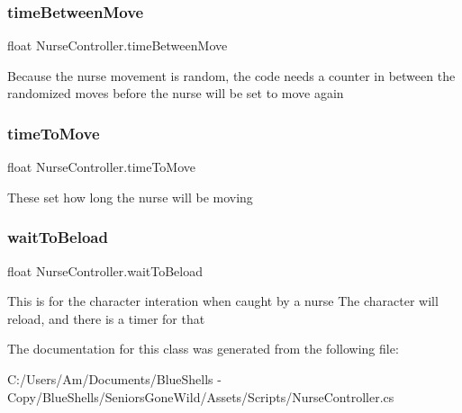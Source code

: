\subsubsection{\texorpdfstring{time\+Between\+Move}{timeBetweenMove}}
{\footnotesize\ttfamily float Nurse\+Controller.\+time\+Between\+Move}



Because the nurse movement is random, the code needs a counter in between the randomized moves before the nurse will be set to move again 

\mbox{\label{class_nurse_controller_a8d3c0f3a1e8e1b2082e98926c1e6ede6}} 
\subsubsection{\texorpdfstring{time\+To\+Move}{timeToMove}}
{\footnotesize\ttfamily float Nurse\+Controller.\+time\+To\+Move}



These set how long the nurse will be moving 

\mbox{\label{class_nurse_controller_a75b6d8fbe22de1d605aff154528d9827}} 
\subsubsection{\texorpdfstring{wait\+To\+Beload}{waitToBeload}}
{\footnotesize\ttfamily float Nurse\+Controller.\+wait\+To\+Beload}



This is for the character interation when caught by a nurse The character will reload, and there is a timer for that 



The documentation for this class was generated from the following file\+:\begin{DoxyCompactItemize}
\item 
C\+:/\+Users/\+Am/\+Documents/\+Blue\+Shells -\/ Copy/\+Blue\+Shells/\+Seniors\+Gone\+Wild/\+Assets/\+Scripts/Nurse\+Controller.\+cs\end{DoxyCompactItemize}
